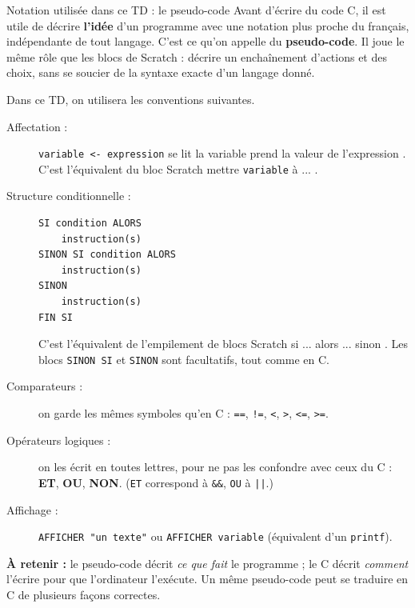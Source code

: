 \begin{UPSTIinfor}{Notation utilisée dans ce TD : le pseudo-code}
    \label{info:pseudocode}
    Avant d'écrire du code C, il est utile de décrire \textbf{l'idée} d'un programme avec une notation plus proche du français, indépendante de tout langage. C'est ce qu'on appelle du \textbf{pseudo-code}. Il joue le même rôle que les blocs de Scratch : décrire un enchaînement d'actions et des choix, sans se soucier de la syntaxe exacte d'un langage donné.

    Dans ce TD, on utilisera les conventions suivantes.

    \begin{description}
        \item[Affectation :] \verb|variable <- expression| se lit \og la variable prend la valeur de l'expression \fg{}. C'est l'équivalent du bloc Scratch \og mettre \texttt{variable} à ... \fg{}.
        \item[Structure conditionnelle :]
            \begin{verbatim}
SI condition ALORS
    instruction(s)
SINON SI condition ALORS
    instruction(s)
SINON
    instruction(s)
FIN SI
            \end{verbatim}
            C'est l'équivalent de l'empilement de blocs Scratch \og si ... alors ... sinon \fg.
              Les blocs \texttt{SINON SI} et \texttt{SINON} sont facultatifs, tout comme en C.
        \item[Comparateurs :] on garde les mêmes symboles qu'en C : \verb|==|, \verb|!=|, \verb|<|, \verb|>|, \verb|<=|, \verb|>=|.
        \item[Opérateurs logiques :] on les écrit en toutes lettres, pour ne pas les confondre avec ceux du C : \textbf{ET}, \textbf{OU}, \textbf{NON}. (\texttt{ET} correspond à \texttt{\&\&}, \texttt{OU} à \texttt{||}.)
        \item[Affichage :] \verb|AFFICHER "un texte"| ou \verb|AFFICHER variable| (équivalent d'un \texttt{printf}).
    \end{description}

    \textbf{À retenir :} le pseudo-code décrit \emph{ce que fait} le programme ; le C décrit \emph{comment} l'écrire pour que l'ordinateur l'exécute. Un même pseudo-code peut se traduire en C de plusieurs façons correctes.
\end{UPSTIinfor}


